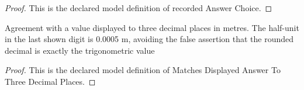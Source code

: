 \begin{proof}
  This is the declared model definition of recorded Answer Choice.
\end{proof}
\begin{definition}
  \label{def:physics:phyx-mini-0678:phyxminiproblems-problemphyxmini0678-matchesdisplayedanswertothreedecimalplaces}
  Agreement with a value displayed to three decimal places in metres. The half-unit in the last shown digit is 0.0005 m, avoiding the false assertion that the rounded decimal is exactly the trigonometric value
\end{definition}
\begin{proof}
  This is the declared model definition of Matches Displayed Answer To Three Decimal Places.
\end{proof}
